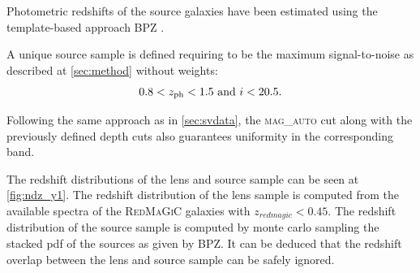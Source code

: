 Photometric redshifts of the source galaxies have been estimated using the template-based approach BPZ \cite{2000ApJ...536..571B}.
\newline

A unique source sample is defined requiring to be the maximum signal-to-noise as described at \autoref{sec:method} without weights:
\begin{equation}
	0.8 < z_{\rm ph} < 1.5\mbox{ and }i<20.5.
\end{equation}

Following the same approach as in \autoref{sec:svdata}, the {\scshape mag\_auto} cut along with the previously defined depth cuts also guarantees uniformity in the corresponding band.
\newline

The redshift distributions of the lens and source sample can be seen at \autoref{fig:ndz_y1}. The redshift distribution of the lens sample is computed from the available spectra of the {\scshape RedMaGiC} galaxies with $z_{redmagic}<0.45$. The redshift distribution of the source sample is computed by monte carlo sampling the stacked pdf of the sources as given by BPZ. It can be deduced that the redshift overlap between the lens and source sample can be safely ignored.

